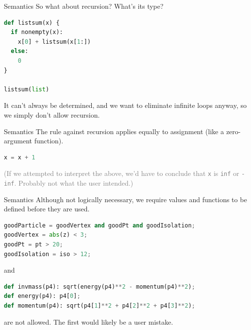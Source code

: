 \documentclass{beamer}
\begin{document}
\begin{frame}[fragile]{Semantics}
So what about recursion? What's its type?

\begin{center}
\begin{minipage}{0.9\linewidth}
\small
\begin{lstlisting}[language=python]
def listsum(x) {
  if nonempty(x):
    x[0] + listsum(x[1:])
  else:
    0
}

listsum(list)
\end{lstlisting}
\end{minipage}
\end{center}

It can't always be determined, and we want to eliminate infinite loops anyway, so we simply don't allow recursion.
\end{frame}

\begin{frame}[fragile]{Semantics}
The rule against recursion applies equally to assignment (like a zero-argument function).

\begin{center}
\begin{minipage}{0.9\linewidth}
\small
\begin{lstlisting}[language=python]
x = x + 1
\end{lstlisting}
\end{minipage}
\end{center}

\textcolor{gray}{(If we attempted to interpret the above, we'd have to conclude that {\tt x} is {\tt inf} or {\tt -inf}. Probably not what the user intended.)}
\end{frame}

\begin{frame}[fragile]{Semantics}
\vspace{0.5 cm}
Although not logically necessary, we require values and functions to be defined before they are used.

\begin{center}
\begin{minipage}{0.9\linewidth}
\small
\begin{lstlisting}[language=python]
goodParticle = goodVertex and goodPt and goodIsolation;
goodVertex = abs(z) < 3;
goodPt = pt > 20;
goodIsolation = iso > 12;
\end{lstlisting}
\hspace{-0.6 cm} and
\begin{lstlisting}[language=python]
def invmass(p4): sqrt(energy(p4)**2 - momentum(p4)**2);
def energy(p4): p4[0];
def momentum(p4): sqrt(p4[1]**2 + p4[2]**2 + p4[3]**2);
\end{lstlisting}
\end{minipage}
\end{center}

are not allowed. The first would likely be a user mistake.
\end{frame}
\end{document}
